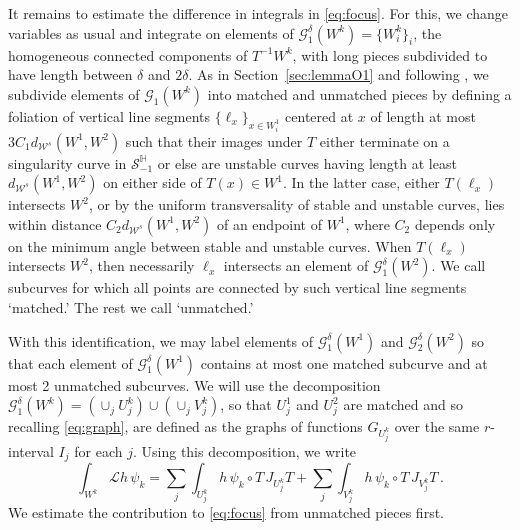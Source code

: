 \documentclass{amsart}
\numberwithin{equation}{section}
\newcommand\cG{{\mathcal G}}
\newcommand\cL{{\mathcal L}}
\newcommand\cS{{\mathcal S}}
\newcommand\cW{{\mathcal W}}
\newcommand\bH{{\mathbb H}}
\begin{document}
It remains to estimate the difference in integrals in \eqref{eq:focus}.  For this, we change variables as usual
and integrate on elements of $\cG_1^\delta(W^k) = \{ W^k_i \}_i$, the homogeneous connected components
of $T^{-1}W^k$, with long pieces subdivided to have length between $\delta$ and $2\delta$.  As in 
Section~\ref{sec:lemmaO1} and following \cite[Sect.~5.2.3]{DL22}, we subdivide elements of
$\cG_1(W^k)$ into matched and unmatched pieces by defining a foliation of vertical line segments 
$\{ \ell_x \}_{x \in W^1_i}$ centered at $x$ of length at most $3 C_1 d_{\cW^s}(W^1, W^2)$
such that their images under $T$ either terminate on a singularity curve in $\cS_{-1}^{\bH}$ or else
are unstable curves having length at least 
$d_{\cW^s}(W^1, W^2)$ on either side of $T(x) \in W^1$.  In the latter
case, either $T(\ell_x)$ intersects $W^2$, or by the uniform transversality of stable and unstable
curves, lies within distance $C_2 d_{\cW^s}(W^1, W^2)$ of an endpoint of $W^1$, where 
$C_2$ depends only on the minimum angle between stable and unstable curves.
When $T(\ell_x)$ intersects $W^2$, then necessarily $\ell_x$ intersects an element of 
$\cG_1^\delta(W^2)$.  We call subcurves for which all points are connected by such vertical line segments `matched.'  The rest we call `unmatched.' 

With this identification, we may label elements of $\cG_1^\delta(W^1)$ and $\cG_2^\delta(W^2)$
so that each element of $\cG_1^\delta(W^1)$ contains at most one matched subcurve and
at most 2 unmatched subcurves.  We will use the decomposition
$\cG_1^\delta(W^k) =( \cup_j U^k_j )\cup (\cup_j V_j^k)$, so that $U^1_j$ and $U^2_j$ are matched
and so recalling \eqref{eq:graph}, are defined as the graphs of functions $G_{U^k_j}$ over the same
$r$-interval $I_j$ for each $j$.  Using this decomposition, we write
\[
\int_{W^k} \cL h \, \psi_k = \sum_j \int_{U^k_j} h \, \psi_k \circ T \, J_{U^k_j} T 
+ \sum_j \int_{V^k_j} h \, \psi_k \circ T \, J_{V^k_j}T \, .
\]
We estimate the contribution to \eqref{eq:focus} from unmatched pieces first.
\end{document}
